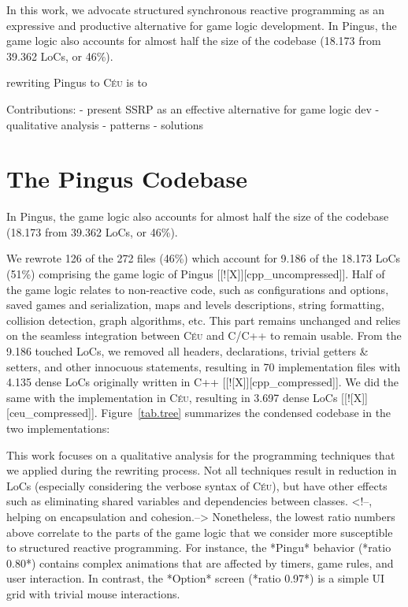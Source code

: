 \documentclass{vgtc}                          %
\newcommand{\CEU}{\textsc{C\'{e}u}\xspace}
\begin{document}
In this work, we advocate structured synchronous reactive programming as an
expressive and productive alternative for game logic development.
In Pingus, the game logic also accounts for almost half the size of the
codebase (18.173 from 39.362 LoCs, or 46\%).

rewriting Pingus to \CEU is to

Contributions:
    - present SSRP as an effective alternative for game logic dev
    - qualitative analysis
        - patterns
            - solutions


\section{The Pingus Codebase}

In Pingus, the game logic also accounts for almost half the size of the
codebase (18.173 from 39.362 LoCs, or 46\%).

We rewrote 126 of the 272 files (46\%) which account for 9.186 of the 18.173
LoCs (51\%) comprising the game logic of Pingus [[![X]][cpp\_uncompressed]].
Half of the game logic relates to non-reactive code, such as configurations and
options, saved games and serialization, maps and levels descriptions, string
formatting, collision detection, graph algorithms, etc.
This part remains unchanged and relies on the seamless integration between \CEU
and C/C++ to remain usable.
From the 9.186 touched LoCs, we removed all headers, declarations, trivial
getters \& setters, and other innocuous statements, resulting in 70
implementation files with 4.135 dense LoCs originally written in C++
[[![X]][cpp\_compressed]].
We did the same with the implementation in \CEU, resulting in 3.697 dense LoCs
[[![X]][ceu\_compressed]].
Figure~\ref{tab.tree} summarizes the condensed codebase in the two
implementations:

This work focuses on a qualitative analysis for the programming techniques
that we applied during the rewriting process.
Not all techniques result in reduction in LoCs (especially considering the
verbose syntax of \CEU), but have other effects such as eliminating shared
variables and dependencies between classes.
<!--, helping on encapsulation and cohesion.-->
Nonetheless, the lowest ratio numbers above correlate to the parts of the game
logic that we consider more susceptible to structured reactive programming.
For instance, the *Pingu* behavior (*ratio 0.80*) contains complex animations
that are affected by timers, game rules, and user interaction.
In contrast, the *Option* screen (*ratio 0.97*) is a simple UI grid with
trivial mouse interactions.
\end{document}
